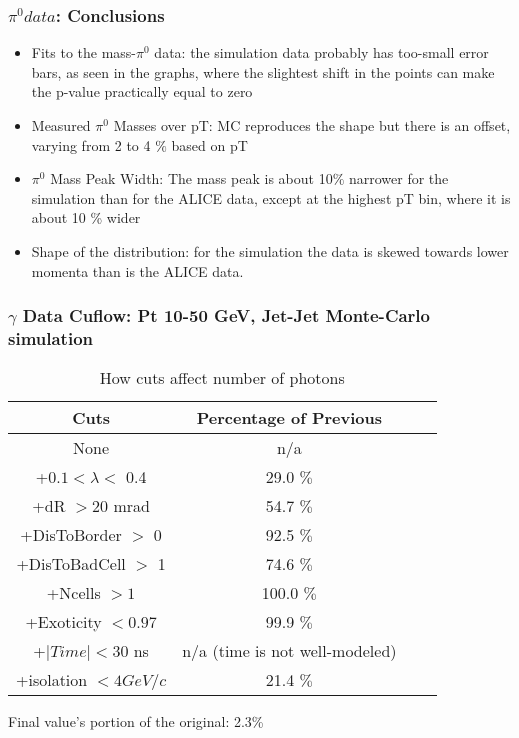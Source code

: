 \documentclass{beamer}
\begin{document}
\frame
{
	\frametitle{$\pi^0 data$: Conclusions}
	\begin{itemize}
	\item Fits to the mass-$\pi^0$ data: the simulation data probably has too-small error bars, as seen in the graphs, where the slightest shift in the points can make the p-value practically equal to zero
	\item Measured $\pi^0$ Masses over pT: MC reproduces the shape but there is an offset, varying from 2 to 4 $\%$ based on pT
	\item $\pi^0$ Mass Peak Width: The mass peak is about 10$\%$ narrower for the simulation than for the ALICE data, except at the highest pT bin, where it is about 10 \% wider
	\item Shape of the distribution: for the simulation the data is skewed towards lower momenta than is the ALICE data.
	\end{itemize}
}


\frame 
{ 
\frametitle{$\gamma$ Data Cuflow: Pt 10-50 GeV, Jet-Jet Monte-Carlo simulation} 
\begin{table} 
\caption{How cuts affect number of photons} 
\centering 
\begin{tabular}{c c c c} 
\hline\hline 
Cuts & Percentage of Previous\\ [0.5ex] 
\hline
None & n/a\\
+$0.1 < \lambda <$ 0.4 & 29.0 $\%$ \\
+dR $> 20$ mrad & 54.7 $\%$ \\
+DisToBorder $>$ 0 & 92.5 $\%$ \\
+DisToBadCell $>$ 1 & 74.6 $\%$ \\
+Ncells $> 1$ & 100.0 $\%$ \\
+Exoticity $< 0.97$ & 99.9 $\%$ \\
+$|Time| < 30$ ns & n/a (time is not well-modeled)  \\
+isolation $< 4 GeV/c$ & 21.4 $\%$ \\
[1ex] 
\hline 
\end{tabular} 
\label{table:nonlin} 
\end{table} 
 Final value's portion of the original: 2.3\%
 } 
\end{document}
